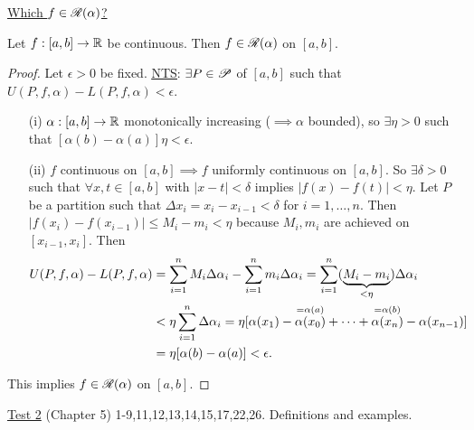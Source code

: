 \documentclass[]{article}
\begin{document}
\ul{Which $f\in\ms R(\alpha)$?}
\begin{theorem}
	Let $f:[a,b]\ra\mb R$ be continuous. Then $f\in\ms R(\alpha)$ on $[a,b]$.
\end{theorem}
\begin{proof}
	Let $\epsilon>0$ be fixed. \ul{\ul{NTS}}: $\exists P\in\ms P$ of $[a,b]$ such that $U(P,f,\alpha)-L(P,f,\alpha)<\epsilon$.
	\begin{note}
		\begin{enumerate}
			\item[(i)] $\alpha:[a,b]\ra\mb R$ monotonically increasing ($\implies\alpha$ bounded), so $\exists\eta>0$ such that $[\alpha(b)-\alpha(a)]\eta<\epsilon$.
			\item[(ii)] $f$ continuous on $[a,b] \implies f$ uniformly continuous on $[a,b]$. So $\exists\delta>0$ such that $\forall x,t\in[a,b]$ with $|x-t|<\delta$ implies $|f(x)-f(t)|<\eta$.
				Let $P$ be a partition such that $\Delta x_i = x_i-x_{i-1} < \delta$ for $i=1,\dots,n$.
				Then $|f(x_i)-f(x_{i-1})| \leq M_i-m_i < \eta$ because $M_i,m_i$ are achieved on $[x_{i-1},x_i]$.
				Then 
				\begin{align*}
					U(P,f,\alpha) - L(P,f,\alpha) 
					&= \sum_{i=1}^n M_i\Delta\alpha_i - \sum_{i=1}^n m_i\Delta\alpha_i
					= \sum_{i=1}^n (\ub{<\eta}{M_i-m_i})\Delta\alpha_i \\
					&< \eta\sum_{i=1}^n \Delta\alpha_i = \eta [\alpha(x_1) - \os{=\alpha(a)}{\alpha(x_0)} + \dots + \os{=\alpha(b)}{\alpha(x_n)} - \alpha(x_{n-1})] \\
					&= \eta[\alpha(b)-\alpha(a)] < \epsilon.
				\end{align*}
		\end{enumerate}
	\end{note}
	This implies $f\in\ms R(\alpha)$ on $[a,b]$.
\end{proof}

\ul{Test 2} (Chapter 5) 1-9,11,12,13,14,15,17,22,26.
Definitions and examples.
\end{document}
